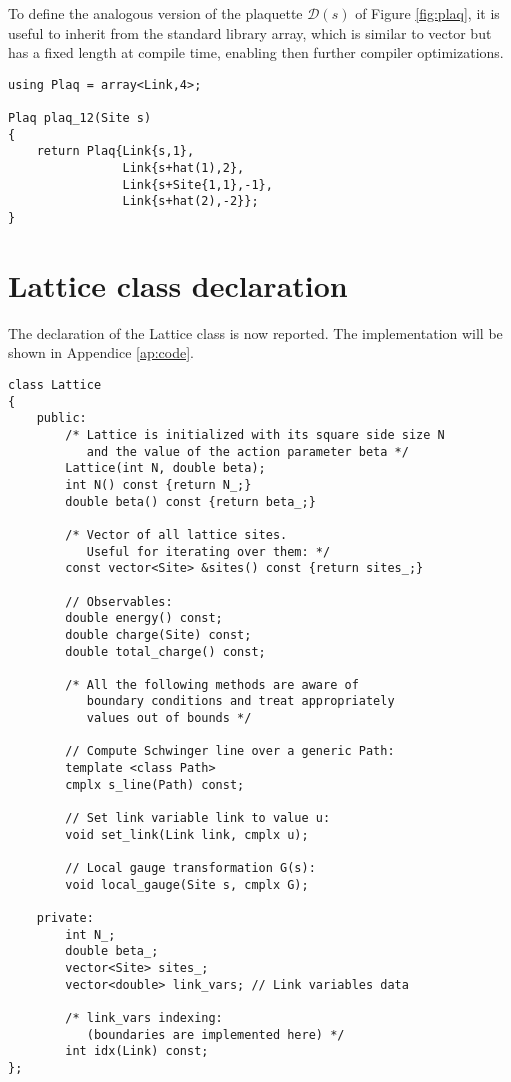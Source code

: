 To define the analogous version of the plaquette $\mathcal D(s)$ of Figure \ref{fig:plaq},
it is useful to inherit from the standard library {\ttfamily array},
which is similar to {\ttfamily vector} but has a fixed length at compile time,
enabling then further compiler optimizations.
\begin{lstlisting}[caption={Plaquette type}]
using Plaq = array<Link,4>;

Plaq plaq_12(Site s)
{
    return Plaq{Link{s,1},
                Link{s+hat(1),2},
                Link{s+Site{1,1},-1},
                Link{s+hat(2),-2}};
}
\end{lstlisting}

\section{Lattice class declaration}

The declaration of the {\ttfamily Lattice} class is now reported.
The implementation will be shown in Appendice \ref{ap:code}.

\begin{lstlisting}[caption={Lattice class}]
class Lattice
{
    public:
        /* Lattice is initialized with its square side size N
           and the value of the action parameter beta */
        Lattice(int N, double beta);
        int N() const {return N_;}
        double beta() const {return beta_;}
        
        /* Vector of all lattice sites.
           Useful for iterating over them: */
        const vector<Site> &sites() const {return sites_;}
        
        // Observables: 
        double energy() const;
        double charge(Site) const;
        double total_charge() const;
        
        /* All the following methods are aware of
           boundary conditions and treat appropriately
           values out of bounds */
        
        // Compute Schwinger line over a generic Path:
        template <class Path>
        cmplx s_line(Path) const;
        
        // Set link variable link to value u:
        void set_link(Link link, cmplx u);
        
        // Local gauge transformation G(s):
        void local_gauge(Site s, cmplx G);
        
    private:
        int N_;
        double beta_;
        vector<Site> sites_;
        vector<double> link_vars; // Link variables data
        
        /* link_vars indexing:
           (boundaries are implemented here) */
        int idx(Link) const;
};
\end{lstlisting}

